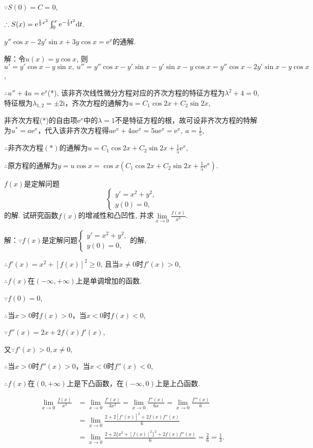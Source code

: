 \documentclass[12pt,UTF8]{ctexart}
\newcommand{\md}[1]{\mathrm d#1}
\newcommand{\me}[0]{\mathrm e}
\newcommand{\m}[0]{\mathrm }
\begin{document}
\begin{enumerate}
$\because S(0)=C=0$,

$\therefore S(x)=\me^{\frac12x^2}\varint_0^x\me^{-\frac12t^2}\md t$.

$y''\cos x-2y'\sin x+3y\cos x=\me^x$的通解.

解：令$u(x)=y\cos x$, 则$u'=y'\cos x-y\sin x,\ u''=y''\cos x-y'\sin x-y'\sin x-y\cos x=y''\cos x-2y'\sin x-y\cos x$,

$\therefore u''+4u=\me^x$(*), 该非齐次线性微分方程对应的齐次方程的特征方程为$\lambda^2+4=0$, 特征根为$\lambda_{1,2}=\pm2\m i$，齐次方程的通解为$u=C_1\cos2x+C_2\sin2x$,

非齐次方程(*)的自由项$\me^x$中的$\lambda=1$不是特征方程的根，故可设非齐次方程的特解为$u^*=a\me^x$，代入该非齐次方程得$a\me^x+4a\me^x=5a\me^x=\me^x,\ a=\frac15$,

$\therefore$非齐次方程$(*)$的通解为$u=C_1\cos2x+C_2\sin2x+\frac15\me^x$,

$\therefore$原方程的通解为$y=u\cos x=\cos x(C_1\cos2x+C_2\sin2x+\frac15\me^x)$.

$f(x)$是定解问题\[\begin{cases}
y'=x^2+y^2,\\
y(0)=0,
\end{cases}\]的解. 试研究函数$f(x)$的增减性和凸凹性, 并求$\lim\limits_{x\rightarrow0}\frac{f(x)}{x^3}$.

解：$\because f(x)$是定解问题$\begin{cases}
y'=x^2+y^2,\\
y(0)=0,
\end{cases}$的解,

$\therefore f'(x)=x^2+[f(x)]^2\geqslant0$, 且当$x\neq0$时$f'(x)>0$,

$\therefore f(x)$在$(-\infty,+\infty)$上是单调增加的函数.

$\because f(0)=0$,

$\therefore$当$x>0$时$f(x)>0$，当$x<0$时$f(x)<0$,

$\because f''(x)=2x+2f(x)f'(x)$,

又$\because f'(x)>0,x\neq0$,

$\therefore$当$x>0$时$f''(x)>0$，当$x<0$时$f''(x)<0$,

$\therefore f(x)$在$(0,+\infty)$上是下凸函数，在$(-\infty,0)$上是上凸函数.

\[\begin{aligned}
\lim\limits_{x\rightarrow0}\frac{f(x)}{x^3}&=\lim\limits_{x\rightarrow0}\frac{f'(x)}{3x^2}=\lim\limits_{x\rightarrow0}\frac{f''(x)}{6x}=\lim\limits_{x\rightarrow0}\frac{f'''(x)}6\\
&=\lim\limits_{x\rightarrow0}\frac{2+2[f'(x)]^2+2f(x)f''(x)}6\\
&=\lim\limits_{x\rightarrow0}\frac{2+2\{x^2+[f(x)]^2\}^2+2f(x)f''(x)}6=\frac26=\frac13.
\end{aligned}\]
\end{enumerate}
\end{document}
